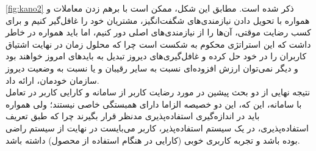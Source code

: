 \ref{fig:kano2}
ذکر شده است. مطابق این شکل، ممکن است با برهم زدن معاملات و همواره با تحویل دادن نیاز‌مندی‌های شگفت‌انگیز، مشتریان خود را غافل‌گیر کنیم و برای کسب رضایت موقتی، آن‌ها را از نیازمندی‌های اصلی دور کنیم، اما باید همواره در خاطر داشت که این استراتژی محکوم به شکست است چرا که محلول زمان در نهایت اشتیاق کاربران را در خود حل کرده و غافل‌گیری‌های دیروز تبدیل به باید‌های امروز خواهند بود و دیگر نمی‌توان ارزش افزوده‌ای نسبت به سایر رقیبان و یا نسبت به وضعیت دیروز سازمان خودمان، ارائه داد.\\
نتیجه نهایی از دو بحث پیشین در مورد رضایت کاربر از سامانه و کارایی کاربر در تعامل با سامانه، این که، این دو خصیصه الزاما دارای همبستگی خاصی نیستند؛ ولی همواره باید در اندازه‌گیری استفاده‌پذیری مدنظر قرار بگیرند چرا که طبق تعریف استفاده‌پذیری، در یک سیستم استفاده‌پذیر، کاربر می‌بایست در نهایت از سیستم راضی بوده باشد و تجربه کاربری خوبی (کارایی در هنگام استفاده از محصول) داشته باشد.
